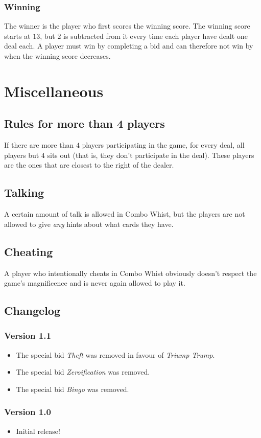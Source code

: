 \documentclass[a4paper]{article}
\begin{document}
{{			\subsubsection{Winning}{%
				The winner is the player who first scores the winning score. The winning score starts at $13$, but $2$ is subtracted from it every time each player have dealt one deal each. A player must win by completing a bid and can therefore not win by when the winning score decreases.
			}
		}
	}

	\section{Miscellaneous}{%
		\subsection{Rules for more than 4 players}{%
			If there are more than $4$ players participating in the game, for every deal, all players but $4$ sits out (that is, they don't participate in the deal). These players are the ones that are closest to the right of the dealer.
			
			
		}
		
		\subsection{Talking}{%
			A certain amount of talk is allowed in Combo Whist, but the players are not allowed to give \emph{any} hints about what cards they have.
		}
		
		\subsection{Cheating}{%
			A player who intentionally cheats in Combo Whist obviously doesn't respect the game's magnificence and is never again allowed to play it.
		}

		\subsection{Changelog}{%
			\subsubsection{Version 1.1}
			\begin{itemize}
				\item The special bid \emph{Theft} was removed in favour of \emph{Triump Trump}.
				\item The special bid \emph{Zeroification} was removed.
				\item The special bid \emph{Bingo} was removed.
			\end{itemize}
			\subsubsection{Version 1.0}
			\begin{itemize}
				\item Initial release!
			\end{itemize}
		}
	}
\end{document}
